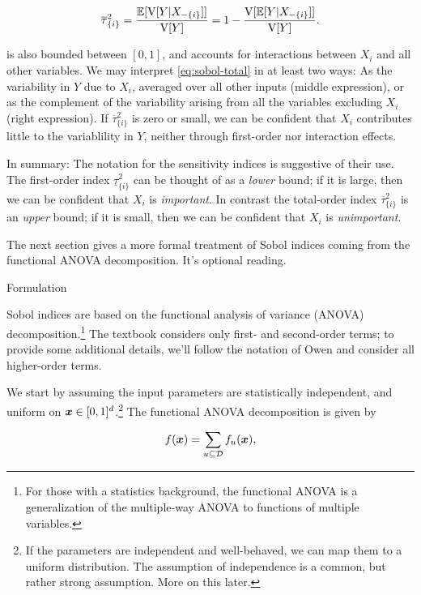\documentclass[../primer.tex]{subfiles}
\begin{document}
\begin{equation}\label{eq:sobol-total}
  \overline{\tau}_{\{i\}}^2 = \frac{\E[\V[Y|X_{-\{i\}}]]}{\V[Y]} = %
  1 - \frac{\V[\E[Y|X_{-\{i\}}]]}{\V[Y]}.
\end{equation}

\noindent {} is also bounded between \([0,1]\), and accounts
for interactions between \(X_i\) and all other variables. We may interpret
\eqref{eq:sobol-total} in at least two ways: As the variability in \(Y\) due to
\(X_i\), averaged over all other inputs (middle expression), or as the complement
of the variability arising from all the variables excluding \(X_i\) (right
expression). If \(\overline{\tau}_{\{i\}}^2\) is zero or small, we can be
confident that \(X_i\) contributes little to the variablility in \(Y\), neither
through first-order nor interaction effects.

In summary: The notation for the sensitivity indices is suggestive of their use.
The first-order index \(\underline{\tau}_{\{i\}}^2\) can be thought of as a
\emph{lower} bound; if it is large, then we can be confident that \(X_i\) is
\emph{important}. In contrast the total-order index \(\overline{\tau}_{\{i\}}^2\) is an
\emph{upper} bound; if it is small, then we can be confident that \(X_i\) is
\emph{unimportant}.

The next section gives a more formal treatment of Sobol indices coming from the
functional ANOVA decomposition. It's optional reading.

Formulation

Sobol indices are based on the functional analysis of variance (ANOVA)
decomposition.\footnote{For those with a statistics background, the functional ANOVA
is a generalization of the multiple-way ANOVA to functions of multiple
variables.} The textbook considers only first- and second-order terms; to
provide some additional details, we'll follow the notation of Owen
\cite{owen2013variance} and consider all higher-order terms.

We start by assuming the input parameters are statistically independent, and
uniform on \(\boldsymbol{x}\in[0,1]^d\).\footnote{If the parameters are independent and
well-behaved, we can map them to a uniform distribution. The assumption of
independence is a common, but rather strong assumption. More on this later.} The
functional ANOVA decomposition is given by

\begin{equation}\label{eq:f-anova}
  f(\boldsymbol{x}) = \sum_{u\subseteq\mathcal{D}} f_u(\boldsymbol{x}),
\end{equation}
\end{document}
